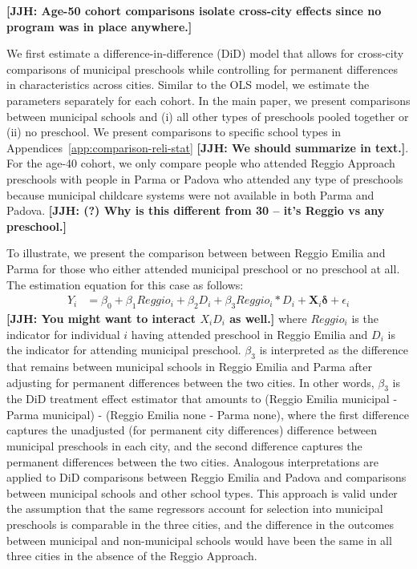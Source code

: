 \textbf{[JJH: Age-50 cohort comparisons isolate cross-city effects since no program was in place anywhere.]}

We first estimate a difference-in-difference (DiD) model that allows for cross-city comparisons of municipal preschools while controlling for permanent differences in characteristics across cities. Similar to the OLS model, we estimate the parameters separately for each cohort. In the main paper, we present comparisons between municipal schools and (i) all other types of preschools pooled together or (ii) no preschool. We present comparisons to specific school types in Appendices~\ref{app:comparison-reli-stat} \textbf{[JJH: We should summarize in text.]}. %
For the age-40 cohort, we only compare people who attended Reggio Approach preschools with people in Parma or Padova who attended any type of preschools because municipal childcare systems were not available in both Parma and Padova. \textbf{[JJH: (?) Why is this different from 30 -- it's Reggio vs any preschool.]}

To illustrate, we present the comparison between between Reggio Emilia and Parma for those who either attended municipal preschool or no preschool at all. The estimation equation for this case as follows:
\begin{eqnarray}  \label{eq:specific2}
Y_i & = \beta_0 + \beta_1 Reggio_i + \beta_2 D_i + \beta_3 Reggio_i * D_i + \bm{X}_i \bm{\delta} + \epsilon_i
\end{eqnarray}
\noindent \textbf{[JJH: You might want to interact $X_i D_i$ as well.]} where $Reggio_i$ is the indicator for individual $i$ having attended preschool in Reggio Emilia and $D_i$ is the indicator for attending municipal preschool. $\beta_3$ is interpreted as the difference that remains between municipal schools in Reggio Emilia and Parma after adjusting for permanent differences between the two cities. In other words, $\beta_3$ is the DiD treatment effect estimator that amounts to (Reggio Emilia municipal - Parma municipal) - (Reggio Emilia none - Parma none), where the first difference captures the unadjusted (for permanent city differences) difference between municipal preschools in each city, and the second difference captures the permanent differences between the two cities. Analogous interpretations are applied to DiD comparisons between Reggio Emilia and Padova and comparisons between municipal schools and other school types. This approach is valid under the assumption that the same regressors account for selection into municipal preschools is comparable in the three cities, and the difference in the outcomes between municipal and non-municipal schools would have been the same in all three cities in the absence of the Reggio Approach.

